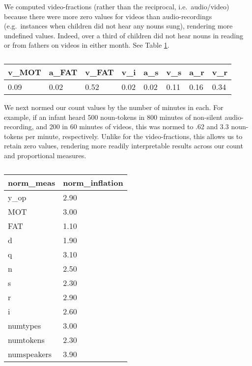 \documentclass[floatsintext,man]{apa6}
\theoremstyle{definition}
\theoremstyle{definition}
\theoremstyle{definition}
\theoremstyle{remark}
\begin{document}
We computed video-fractions (rather than the reciprocal,
i.e.~audio/video) because there were more zero values for videos than
audio-recordings (e.g.~instances when children did not hear any nouns
sung), rendering more undefined values. Indeed, over a third of children
did not hear nouns in reading or from fathers on videos in either month.
See Table \ref{tab:propna-missing-tables}.

\begin{table}[tbp]
\begin{center}
\begin{threeparttable}
\caption{\label{tab:propna-missing-tables}}
\begin{tabular}{llllllll}
\toprule
v\_MOT & \multicolumn{1}{c}{a\_FAT} & \multicolumn{1}{c}{v\_FAT} & \multicolumn{1}{c}{v\_i} & \multicolumn{1}{c}{a\_s} & \multicolumn{1}{c}{v\_s} & \multicolumn{1}{c}{a\_r} & \multicolumn{1}{c}{v\_r}\\
\midrule
0.09 & 0.02 & 0.52 & 0.02 & 0.02 & 0.11 & 0.16 & 0.34\\
\bottomrule
\end{tabular}
\end{threeparttable}
\end{center}
\end{table}

We next normed our count values by the number of minutes in each. For
example, if an infant heard 500 noun-tokens in 800 minutes of non-silent
audio-recording, and 200 in 60 minutes of videos, this was normed to .62
and 3.3 noun-tokens per minute, respectively. Unlike for the
video-fractions, this allows us to retain zero values, rendering more
readily interpretable results across our count and proportional
measures.

\begin{table}[tbp]
\begin{center}
\begin{threeparttable}
\caption{\label{tab:normtable}}
\begin{tabular}{ll}
\toprule
norm\_meas & \multicolumn{1}{c}{norm\_inflation}\\
\midrule
y\_op & 2.90\\
MOT & 3.00\\
FAT & 1.10\\
d & 1.90\\
q & 3.10\\
n & 2.50\\
s & 2.30\\
r & 2.90\\
i & 2.60\\
numtypes & 3.00\\
numtokens & 2.30\\
numspeakers & 3.90\\
\bottomrule
\end{tabular}
\end{threeparttable}
\end{center}
\end{table}
\end{document}
